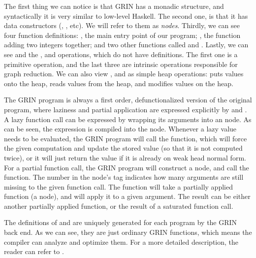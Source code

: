 \documentclass[main.tex]{subfiles}
\begin{document}
	The first thing we can notice is that GRIN has a monadic structure, and syntactically it is very similar to low-level Haskell. The second one, is that it has data constructors (, , etc). We will refer to them as \emph{nodes}. Thirdly, we can see four function definitions: , the main entry point of our program; , the function adding two integers together; and two other functions called  and . Lastly, we can see  and the ,  and  operations, which do not have definitions. The first one is a primitive operation, and the last three are intrinsic operations responsible for graph reduction. We can also view ,  and  as simple heap operations:  puts values onto the heap,   reads values from the heap, and  modifies values on the heap.
	
	
	The GRIN program is always a first order, defunctionalized version of the original program, where laziness and partial application are expressed explicitly by  and . A lazy function call can be expressed by wrapping its arguments into an  node. As can be seen, the  expression is compiled into the  node. Whenever a lazy value needs to be evaluated, the GRIN program will call the   function, which will force the given computation and update the stored value (so that it is not computed twice), or it will just return the value if it is already on weak head normal form. For a partial function call, the GRIN program will construct a  node, and call the  function. The number in the  node's tag indicates how many arguments are still missing to the given function call. The  function will take a partially applied function (a  node), and will apply it to a given argument. The result can be either another partially applied function, or the result of a saturated function call. 
	
	The definitions of  and  are uniquely generated for each program by the GRIN back end. As we can see, they are just ordinary GRIN functions, which means the compiler can analyze and optimize them. For a more detailed description, the reader can refer to \cite{boquist-grin, boquist-phd}.
	
\end{document}
